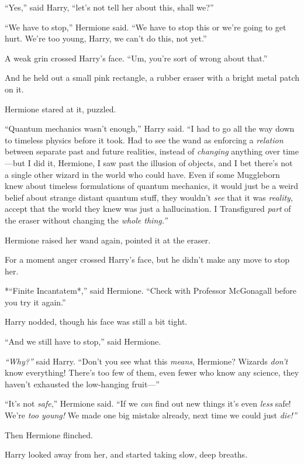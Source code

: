 ``Yes,'' said Harry, ``let's not tell her about this, shall we?''

``We have to stop,'' Hermione said. ``We have to stop this or we're
going to get hurt. We're too young, Harry, we can't do this, not yet.''

A weak grin crossed Harry's face. ``Um, you're sort of wrong about
that.''

And he held out a small pink rectangle, a rubber eraser with a bright
metal patch on it.

Hermione stared at it, puzzled.

``Quantum mechanics wasn't enough,'' Harry said. ``I had to go all the
way down to timeless physics before it took. Had to see the wand as
enforcing a \emph{relation} between separate past and future realities,
instead of \emph{changing} anything over time---but I did it, Hermione,
I saw past the illusion of objects, and I bet there's not a single other
wizard in the world who could have. Even if some Muggleborn knew about
timeless formulations of quantum mechanics, it would just be a weird
belief about strange distant quantum stuff, they wouldn't \emph{see}
that it was \emph{reality}, accept that the world they knew was just a
hallucination. I Transfigured \emph{part} of the eraser without changing
the \emph{whole thing.''}

Hermione raised her wand again, pointed it at the eraser.

For a moment anger crossed Harry's face, but he didn't make any move to
stop her.

*``Finite Incantatem*,'' said Hermione. ``Check with Professor
McGonagall before you try it again.''

Harry nodded, though his face was still a bit tight.

``And we still have to stop,'' said Hermione.

\emph{``Why?''} said Harry. ``Don't you see what this \emph{means},
Hermione? Wizards \emph{don't} know everything! There's too few of them,
even fewer who know any science, they haven't exhausted the low-hanging
fruit---''

``It's not \emph{safe},'' Hermione said. ``If we \emph{can} find out new
things it's even \emph{less} safe! We're \emph{too young!} We made one
big mistake already, next time we could just \emph{die!''}

Then Hermione flinched.

Harry looked away from her, and started taking slow, deep breaths.

